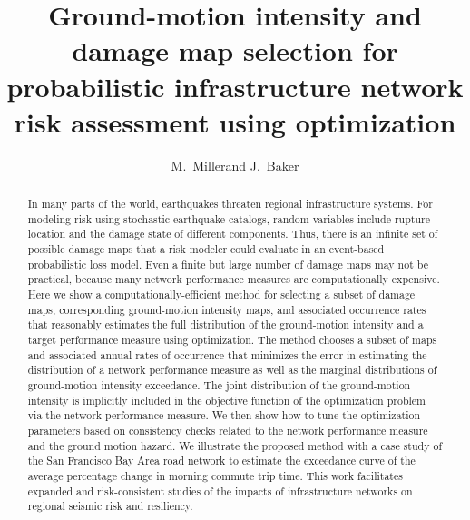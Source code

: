 \documentclass[times]{eqeauth}
\begin{document}

\title{Ground-motion intensity and damage map selection for probabilistic infrastructure network risk assessment using optimization}

\author{M.~Miller\corrauth and J.~Baker}

\address{Department of Civil and Environmental Engineering, Stanford University, Stanford, CA 94305-4020, U.S.A.}



\begin{abstract}
In many parts of the world, earthquakes threaten regional infrastructure systems. For modeling risk using stochastic earthquake catalogs, random variables include rupture location and the damage state of different components. Thus, there is an infinite set of possible damage maps that a risk modeler could evaluate in an event-based probabilistic loss model. Even a finite but large number of damage maps may not be practical, because many network performance measures are computationally expensive. Here we show a computationally-efficient method for selecting a subset of damage maps, corresponding ground-motion intensity maps, and associated occurrence rates that reasonably estimates the full distribution of the ground-motion intensity and a target performance measure using optimization. The method chooses a subset of maps and associated annual rates of occurrence that minimizes the error in estimating the distribution of a network performance measure as well as the marginal distributions of ground-motion intensity exceedance. The joint distribution of the ground-motion intensity is implicitly included in the objective function of the optimization problem via the network performance measure. We then show how to tune the optimization parameters based on consistency checks related to  the network performance measure and the ground motion hazard. We illustrate the proposed method with a case study of the San Francisco Bay Area road network to estimate the exceedance curve of the average percentage change in morning commute trip time. This work facilitates expanded and risk-consistent studies of the impacts of infrastructure networks on regional seismic risk and resiliency.
\end{abstract}
\end{document}

